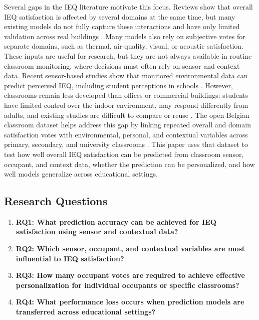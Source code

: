 ﻿\documentclass[11pt]{article}
\newcommand{\Reviewed}[1]{\begingroup\color{black}#1\endgroup}
\begin{document}
{Several gaps in the IEQ literature motivate this focus. Reviews show that overall IEQ satisfaction is affected by several domains at the same time, but many existing models do not fully capture these interactions and have only limited validation across real buildings \cite{heinzerling2013,zhao2023,roumi2022,zhang2023ieqmodels}. Many models also rely on subjective votes for separate domains, such as thermal, air-quality, visual, or acoustic satisfaction. These inputs are useful for research, but they are not always available in routine classroom monitoring, where decisions must often rely on sensor and context data. Recent sensor-based studies show that monitored environmental data can predict perceived IEQ, including student perceptions in schools \cite{kallio2020,riffelli2022,alam2025schoolieq}. However, classrooms remain less developed than offices or commercial buildings: students have limited control over the indoor environment, may respond differently from adults, and existing studies are difficult to compare or reuse \cite{teli2012,lala2022children,miao2024students,carton2026review}. The open Belgian classroom dataset helps address this gap by linking repeated overall and domain satisfaction votes with environmental, personal, and contextual variables across primary, secondary, and university classrooms \cite{carton2026dataset}. This paper uses that dataset to test how well overall IEQ satisfaction can be predicted from classroom sensor, occupant, and context data, whether the prediction can be personalized, and how well models generalize across educational settings.}
\Reviewed{
\subsection{Research Questions}

\begin{enumerate}
    \item \textbf{RQ1: What prediction accuracy can be achieved for IEQ satisfaction using sensor and contextual data?}

    \item \textbf{RQ2: Which sensor, occupant, and contextual variables are most influential to IEQ satisfaction?}

    \item \textbf{RQ3: How many occupant votes are required to achieve effective personalization for individual occupants or specific classrooms?}

    \item \textbf{RQ4: What performance loss occurs when prediction models are transferred across educational settings?}
\end{enumerate}}
\end{document}
